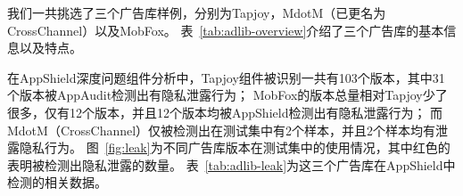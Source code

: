 我们一共挑选了三个广告库样例，分别为Tapjoy，MdotM（已更名为CrossChannel）以及MobFox。
表~\ref{tab:adlib-overview}介绍了三个广告库的基本信息以及特点。

在AppShield深度问题组件分析中，Tapjoy组件被识别一共有103个版本，其中31个版本被AppAudit检测出有隐私泄露行为；
MobFox的版本总量相对Tapjoy少了很多，仅有12个版本，并且12个版本均被AppShield检测出有隐私泄露行为；
而MdotM（CrossChannel）仅被检测出在测试集中有2个样本，并且2个样本均有泄露隐私行为。
图~\ref{fig:leak}为不同广告库版本在测试集中的使用情况，其中红色的表明被检测出隐私泄露的数量。
表~\ref{tab:adlib-leak}为这三个广告库在AppShield中检测的相关数据。

\begin{figure}
  \centering

\end{figure}

